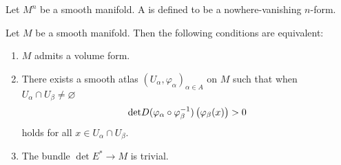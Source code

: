 \begin{definition}
	Let $M^n$ be a smooth manifold. A  is defined to be a nowhere-vanishing $n$-form.
\end{definition}

\begin{corollary}
	Let $M$ be a smooth manifold. Then the following conditions are equivalent:
	\begin{enumerate}[label=\textup{(\alph*)},leftmargin = *]
		\item $M$ admits a volume form.
		\item There exists a smooth atlas $(U_\alpha,\varphi_\alpha)_{\alpha \in A}$ on $M$ such that when $U_\alpha \cap U_\beta \neq \varnothing$
			\begin{equation*}
				\det D(\varphi_\alpha \circ \varphi_\beta^{-1})\del[1]{\varphi_\beta(x)} > 0
			\end{equation*}
			\noindent holds for all $x \in U_\alpha \cap U_\beta$.
		\item The bundle $\det E^* \to M$ is trivial.
	\end{enumerate}
\end{corollary}
